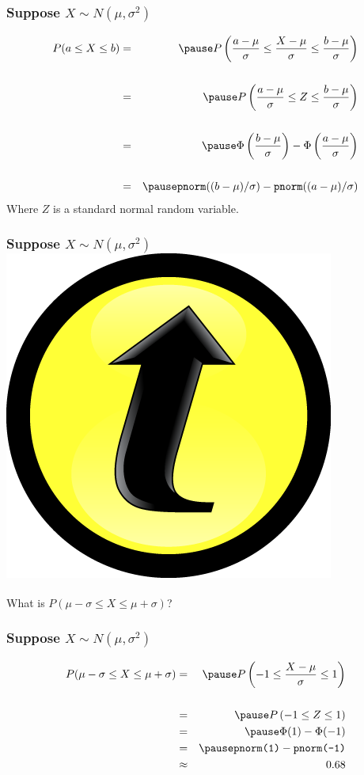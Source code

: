 \documentclass[handout]{beamer}
\begin{document}
\begin{frame}
\frametitle{Suppose $X \sim N(\mu, \sigma^2)$}


\begin{eqnarray*}
	P(a \leq X \leq b) &=& \pause P\left( \frac{a - \mu}{\sigma} \leq \frac{X - \mu}{\sigma} \leq \frac{b-\mu}{\sigma} \right)\\ \\ 
	&=& \pause P\left( \frac{a - \mu}{\sigma} \leq Z \leq \frac{b-\mu}{\sigma} \right)\\ \\ 
	&=& \pause \Phi\left( \frac{b-\mu}{\sigma}\right) - \Phi\left( \frac{a - \mu}{\sigma}\right)\\ \\
	&=&\pause \mbox{\texttt{pnorm}}((b-\mu)/\sigma) -  \mbox{\texttt{pnorm}}((a-\mu)/\sigma)
\end{eqnarray*}
Where $Z$ is a standard normal random variable.
\end{frame}
\begin{frame}
\frametitle{Suppose $X \sim N(\mu, \sigma^2)$\hfill \includegraphics[scale = 0.05]{./images/clicker}}
What is $P(\mu - \sigma \leq X \leq \mu + \sigma)$?
\end{frame}

\begin{frame}
\frametitle{Suppose $X \sim N(\mu, \sigma^2)$}

\begin{eqnarray*}
P(\mu - \sigma \leq X \leq \mu + \sigma) &=&\pause P\left( -1 \leq \frac{X-\mu}{\sigma} \leq 1\right)\\ \\
	&=&\pause P\left( -1 \leq Z \leq 1\right)\\
	&=&\pause \Phi(1) - \Phi(-1)\\
	&=&\pause \mbox{\texttt{pnorm(1)}} -  \mbox{\texttt{pnorm(-1)}}\\
	&\approx& 0.68
\end{eqnarray*}
\end{frame}
\end{document}
